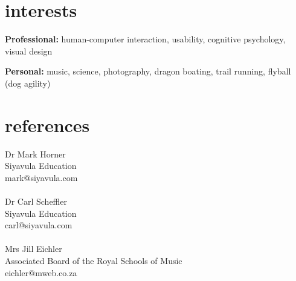 \documentclass[]{friggeri-cv} %
\begin{document}

\section{interests}

\textbf{Professional:} human-computer interaction, usability, cognitive psychology, visual design

\textbf{Personal:} music, science, photography, dragon boating, trail running, flyball (dog agility)


\section{references}

Dr Mark Horner\\
Siyavula Education\\
mark@siyavula.com\\
\\
Dr Carl Scheffler\\
Siyavula Education\\
carl@siyavula.com\\
\\
Mrs Jill Eichler\\
Associated Board of the Royal Schools of Music\\
eichler@mweb.co.za\\
\end{document}
